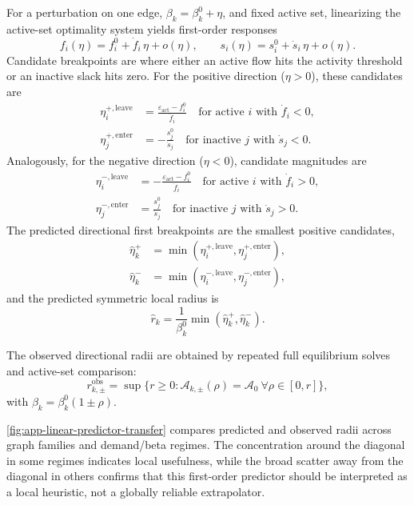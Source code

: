 \documentclass[twocolumn,english,groupedaddress, superscriptaddress,aps,pre,10pt,floatfix]{revtex4-2}
\begin{document}
For a perturbation on one edge, $\beta_k=\beta_k^0+\eta$, and fixed active set, linearizing the active-set optimality system yields first-order responses
\begin{equation}
f_i(\eta)=f_i^0+\dot f_i\,\eta+o(\eta),\qquad
s_i(\eta)=s_i^0+\dot s_i\,\eta+o(\eta).
\end{equation}
Candidate breakpoints are where either an active flow hits the activity threshold or an inactive slack hits zero.
For the positive direction ($\eta>0$), these candidates are
\begin{align}
\eta^{+,\mathrm{leave}}_i &= \frac{\varepsilon_{\mathrm{act}}-f_i^0}{\dot f_i}
\quad\text{for active }i\text{ with }\dot f_i<0,\\
\eta^{+,\mathrm{enter}}_j &= -\frac{s_j^0}{\dot s_j}
\quad\text{for inactive }j\text{ with }\dot s_j<0.
\end{align}
Analogously, for the negative direction ($\eta<0$), candidate magnitudes are
\begin{align}
\eta^{-,\mathrm{leave}}_i &= -\frac{\varepsilon_{\mathrm{act}}-f_i^0}{\dot f_i}
\quad\text{for active }i\text{ with }\dot f_i>0,\\
\eta^{-,\mathrm{enter}}_j &= \frac{s_j^0}{\dot s_j}
\quad\text{for inactive }j\text{ with }\dot s_j>0.
\end{align}
The predicted directional first breakpoints are the smallest positive candidates,
\begin{align}
\hat\eta_k^+ &= \min\!\left(\eta^{+,\mathrm{leave}}_i,\eta^{+,\mathrm{enter}}_j\right),\\
\hat\eta_k^- &= \min\!\left(\eta^{-,\mathrm{leave}}_i,\eta^{-,\mathrm{enter}}_j\right),
\end{align}
and the predicted symmetric local radius is
\begin{equation}
\hat r_k=\frac{1}{\beta_k^0}\min(\hat\eta_k^+,\hat\eta_k^-).
\end{equation}

The observed directional radii are obtained by repeated full equilibrium solves and active-set comparison:
\begin{equation}
r_{k,\pm}^{\mathrm{obs}}=\sup\{r\ge 0:\mathcal{A}_{k,\pm}(\rho)=\mathcal{A}_0\ \forall \rho\in[0,r]\},
\end{equation}
with $\beta_k=\beta_k^0(1\pm \rho)$.

\cref{fig:app-linear-predictor-transfer} compares predicted and observed radii across graph families and demand/beta regimes.
The concentration around the diagonal in some regimes indicates local usefulness, while the broad scatter away from the diagonal in others confirms that this first-order predictor should be interpreted as a local heuristic, not a globally reliable extrapolator.
\end{document}
